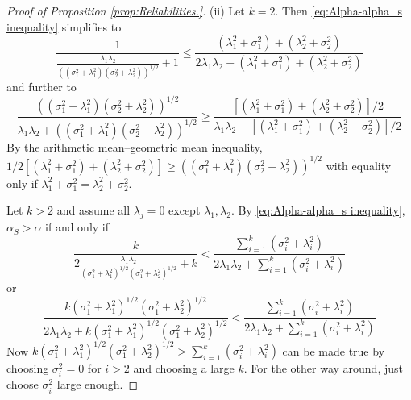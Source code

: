\documentclass[twoside]{article}
\DeclareMathOperator{\tsum}{\textstyle \sum}
\renewcommand{\sqrt}[1]{{(#1)^{1/2}}}
\begin{document}
\begin{proof}[Proof of Proposition \ref{prop:Reliabilities.}]
(ii) Let $k=2$. Then \eqref{eq:Alpha-alpha_s inequality} simplifies to
\[
\frac{1}{\frac{\lambda_{1}\lambda_{2}}{\sqrt{(\sigma_{1}^{2}+\lambda_{1}^{2})(\sigma_{2}^{2}+\lambda_{2}^{2})}}+1}\leq\frac{(\lambda_{1}^{2}+\sigma_{1}^{2})+(\lambda_{2}^{2}+\sigma_{2}^{2})}{2\lambda_{1}\lambda_{2}+(\lambda_{1}^{2}+\sigma_{1}^{2})+(\lambda_{2}^{2}+\sigma_{2}^{2})}
\]
and further to
\begin{equation*}
\frac{\sqrt{(\sigma_{1}^{2}+\lambda_{1}^{2})(\sigma_{2}^{2}+\lambda_{2}^{2})}}{\lambda_{1}\lambda_{2}+\sqrt{(\sigma_{1}^{2}+\lambda_{1}^{2})(\sigma_{2}^{2}+\lambda_{2}^{2})}} \geq \frac{[(\lambda_{1}^{2}+\sigma_{1}^{2})+(\lambda_{2}^{2}+\sigma_{2}^{2})]/2}{\lambda_{1}\lambda_{2}+[(\lambda_{1}^{2}+\sigma_{1}^{2})+(\lambda_{2}^{2}+\sigma_{2}^{2})]/2}
\end{equation*}
By the arithmetic mean--geometric mean inequality, $1/2[(\lambda_{1}^{2}+\sigma_{1}^{2})+(\lambda_{2}^{2}+\sigma_{2}^{2})]\geq\sqrt{(\sigma_{1}^{2}+\lambda_{1}^{2})(\sigma_{2}^{2}+\lambda_{2}^{2})}$
with equality only if $\lambda_{1}^{2}+\sigma_{1}^{2}=\lambda_{2}^{2}+\sigma_{2}^{2}$.

Let $k>2$ and assume all $\lambda_{j}=0$
except $\lambda_{1},\lambda_{2}$. By \eqref{eq:Alpha-alpha_s inequality}, $\alpha_S > \alpha$ if and
only if
\[
\frac{k}{2\frac{\lambda_{1}\lambda_{2}}{\sqrt{\sigma_{1}^{2}+\lambda_{1}^{2}}\sqrt{\sigma_{1}^{2}+\lambda_{2}^{2}}}+k}<\frac{\tsum_{i=1}^{k}(\sigma_{i}^{2}+\lambda_{i}^{2})}{2\lambda_{1}\lambda_{2}+\tsum_{i=1}^{k}(\sigma_{i}^{2}+\lambda_{i}^{2})}
\]
or
\begin{equation*}
\frac{k\sqrt{\sigma_{1}^{2}+\lambda_{1}^{2}}\sqrt{\sigma_{1}^{2}+\lambda_{2}^{2}}}{2\lambda_{1}\lambda_{2}+k\sqrt{\sigma_{1}^{2}+\lambda_{1}^{2}}\sqrt{\sigma_{1}^{2}+\lambda_{2}^{2}}} < \frac{\tsum_{i=1}^{k}(\sigma_{i}^{2}+\lambda_{i}^{2})}{2\lambda_{1}\lambda_{2}+\tsum_{i=1}^{k}(\sigma_{i}^{2}+\lambda_{i}^{2})}
\end{equation*}
Now $k\sqrt{\sigma_{1}^{2}+\lambda_{1}^{2}}\sqrt{\sigma_{1}^{2}+\lambda_{2}^{2}}>\tsum_{i=1}^{k}(\sigma_{i}^{2}+\lambda_{i}^{2})$
can be made true by choosing $\sigma_{i}^{2}=0$ for $i>2$ and choosing a large $k$. For the
other way around, just choose $\sigma_{i}^{2}$ large enough.


\end{proof}
\end{document}

